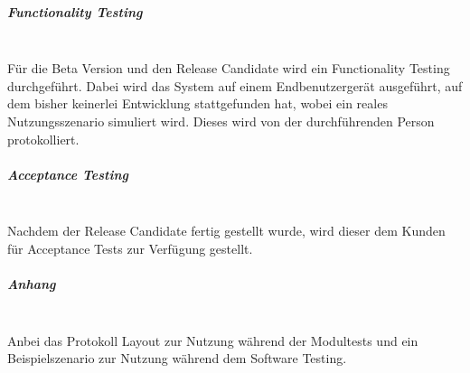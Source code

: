 \documentclass[10pt,a4paper]{article}
\begin{document}
\subparagraph{Functionality Testing}\ \\
Für die Beta Version und den Release Candidate wird ein Functionality Testing durchgeführt. Dabei wird das System auf einem Endbenutzergerät ausgeführt, auf dem bisher keinerlei Entwicklung stattgefunden hat, wobei ein reales Nutzungsszenario simuliert wird. Dieses wird von der durchführenden Person protokolliert.

\subparagraph{Acceptance Testing}\ \\
Nachdem der Release Candidate fertig gestellt wurde, wird dieser dem Kunden für Acceptance Tests zur Verfügung gestellt. 

\subparagraph{Anhang} \ \\
Anbei das Protokoll Layout zur Nutzung während der Modultests und ein Beispielszenario zur Nutzung während dem Software Testing.




\end{document}
